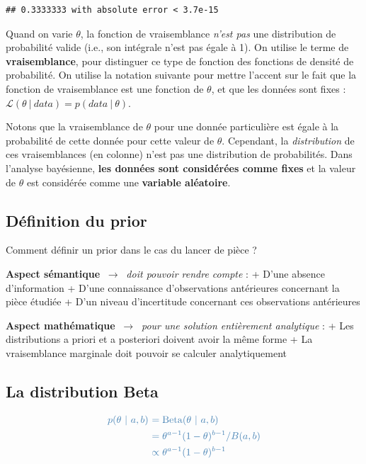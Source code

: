 \documentclass[
  a4paper,11pt,twoside,onecolumn,openright,final,oldfontcommands]{memoir}
\theoremstyle{definition}
\theoremstyle{definition}
\theoremstyle{definition}
\theoremstyle{definition}
\theoremstyle{remark}
\begin{document}
\begin{verbatim}
## 0.3333333 with absolute error < 3.7e-15
\end{verbatim}

Quand on varie \(\theta\), la fonction de vraisemblance \emph{n'est pas} une distribution de probabilité valide (i.e., son intégrale n'est pas égale à 1). On utilise le terme de \textbf{vraisemblance}, pour distinguer ce type de fonction des fonctions de densité de probabilité. On utilise la notation suivante pour mettre l'accent sur le fait que la fonction de vraisemblance est une fonction de \(\theta\), et que les données sont fixes : \(\mathcal{L}(\theta \ | \ data) = p(data \ | \ \theta)\).

Notons que la vraisemblance de \(\theta\) pour une donnée particulière est égale à la probabilité de cette donnée pour cette valeur de \(\theta\). Cependant, la \emph{distribution} de ces vraisemblances (en colonne) n'est pas une distribution de probabilités. Dans l'analyse bayésienne, \textbf{les données sont considérées comme fixes} et la valeur de \(\theta\) est considérée comme une \textbf{variable aléatoire}.

\hypertarget{duxe9finition-du-prior}{%
\subsection{Définition du prior}\label{duxe9finition-du-prior}}

Comment définir un prior dans le cas du lancer de pièce ?

\textbf{Aspect sémantique} \(~\rightarrow~\) \emph{doit pouvoir rendre compte} :
+ D'une absence d'information
+ D'une connaissance d'observations antérieures concernant la pièce étudiée
+ D'un niveau d'incertitude concernant ces observations antérieures

\textbf{Aspect mathématique} \(~\rightarrow~\) \emph{pour une solution entièrement analytique} :
+ Les distributions a priori et a posteriori doivent avoir la même forme
+ La vraisemblance marginale doit pouvoir se calculer analytiquement

\hypertarget{la-distribution-beta}{%
\subsection{La distribution Beta}\label{la-distribution-beta}}

\[
\begin{aligned}
\color{steelblue}{p(\theta\ | \ a, b)} \ &\color{steelblue}{= \mathrm{Beta}(\theta\ |\ a, b)} \\
& \color{steelblue}{= \theta^{a - 1}(1 - \theta)^{b - 1} / B(a, b)} \\
& \color{steelblue}{\propto \theta^{a - 1}(1 - \theta)^{b - 1}}
\end{aligned}
\]
\end{document}
